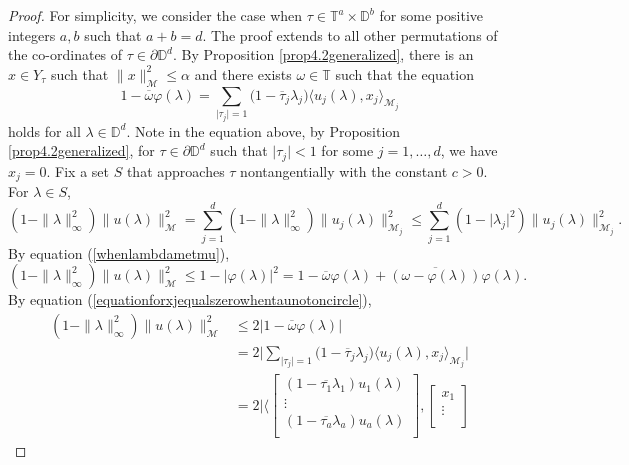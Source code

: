 \documentclass[11pt, reqno]{amsart}
\newcommand\1{\boldsymbol {1}}
\numberwithin{equation}{section}
\begin{document}
\begin{proof}
For simplicity, we consider the case when $\tau\in\mathbb{T}^{a}\times \mathbb{D}^{b}$ for some positive integers $a,b$ such that $a+b=d$. The proof extends to all other permutations of the co-ordinates of $\tau\in\partial\mathbb{D}^{d}$. 
By Proposition \ref{prop4.2generalized}, there is an $x\in Y_{\tau}$ such that $\|x\|_{\mathcal{M}}^{2}\leq \alpha$ and
there exists $\omega\in\mathbb{T}$ such that  the equation
\begin{equation}\label{equationforxjequalszerowhentaunotoncircle}
1-\overline{\omega}\varphi(\lambda)=\sum_{\lvert \tau_{j} \rvert = 1}\Big(1-\overline{\tau}_{j}\lambda_{j}\Big)\langle u_{j}(\lambda),x_{j}\rangle_{\mathcal{M}_{j}}
\end{equation}
holds for all $\lambda\in\mathbb{D}^{d}$.  Note in the equation above, by Proposition \ref{prop4.2generalized}, for $\tau\in\partial\mathbb{D}^{d}$ such that $\lvert \tau_{j}\rvert<1$ for some $j=1,\hdots,d$, we have $x_{j}=0$.
Fix a set $S$ that approaches $\tau$ nontangentially with the constant $c>0$. For $\lambda\in S$, 
$$(1-\|\lambda\|_{\infty}^{2})\|u(\lambda)\|_{\mathcal{M}}^{2}=\sum_{j=1}^{d}(1-\|\lambda\|_{\infty}^{2})\|u_{j}(\lambda)\|_{\mathcal{M}_{j}}^{2}
\leq \sum_{j=1}^{d}(1-\lvert\lambda_{j}\rvert^{2})\|u_{j}(\lambda)\|_{\mathcal{M}_{j}}^{2}.$$
By equation (\ref{whenlambdametmu}),
$$(1-\|\lambda\|_{\infty}^{2})\|u(\lambda)\|_{\mathcal{M}}^{2} \leq 1-\lvert \varphi(\lambda)\rvert^{2}
= 1-\overline{\omega}\varphi(\lambda)+\overline{(\omega-\varphi(\lambda))}\varphi(\lambda).$$
By equation (\ref{equationforxjequalszerowhentaunotoncircle}),
\begin{align*}
(1-\|\lambda\|_{\infty}^{2})\|u(\lambda)\|_{\mathcal{M}}^{2}&\leq 2\lvert 1-\overline{\omega}\varphi(\lambda)\rvert \\
&=2\bigg\lvert\sum_{ \lvert\tau_{j}\rvert=1} \Big( 1-\overline{\tau}_{j}\lambda_{j}\Big)\langle u_{j}(\lambda),x_{j}\rangle_{\mathcal{M}_{j}}\bigg\rvert\\
&=2\Bigg\lvert\Bigg\langle\begin{bmatrix}
	(1-\overline{\tau_{1}}\lambda_{1})u_{1}(\lambda) \\
    \vdots \\
    (1-\overline{\tau_{a}}\lambda_{a})u_{a}(\lambda)  \\
\end{bmatrix},\begin{bmatrix}
	x_{1} \\
    \vdots \\

\end{bmatrix}
\end{align*}
\end{proof}
\end{document}
